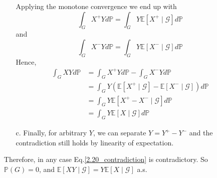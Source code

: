 \begin{enumerate}
\begin{enumerate}
        Applying the monotone convergence we end up with
        \begin{equation}
            \int_{G} X^+ Y d \mathbb{P} = \int_{G} Y \mathbb{E}[X^+ \mid \mathcal{G}] d \mathbb{P}
        \end{equation}
        and
        \begin{equation}
            \int_{G} X^- Y d \mathbb{P} = \int_{G} Y \mathbb{E}[X^- \mid \mathcal{G}] d \mathbb{P}
        \end{equation}
        Hence,
        \begin{equation}
            \begin{split}
                \int_{G} X Y d \mathbb{P}
                &= \int_{G} X^+ Y d \mathbb{P} - \int_{G} X^- Y d \mathbb{P} \\
                &= \int_{G} Y (\mathbb{E}[X^+ \mid \mathcal{G}]  - \mathbb{E}[X^- \mid \mathcal{G}]) d \mathbb{P} \\
                &= \int_{G} Y \mathbb{E}[X^+ - X^- \mid \mathcal{G}] d \mathbb{P} \\
                &= \int_{G} Y \mathbb{E}[X \mid \mathcal{G}] d \mathbb{P}
            \end{split}
        \end{equation}
        \item[c.] Finally, for arbitrary $Y$, we can separate $Y = Y^+ - Y^-$ and the contradiction still holds by linearity of expectation.
    \end{enumerate}

    Therefore, in any case Eq.\ref{2.20_contradiction} is contradictory.
    So $\mathbb{P}(G) = 0$, and $\mathbb{E}[X Y \mid \mathcal{G}] = Y \mathbb{E}[X \mid \mathcal{G}]$ a.s.


\end{enumerate}
